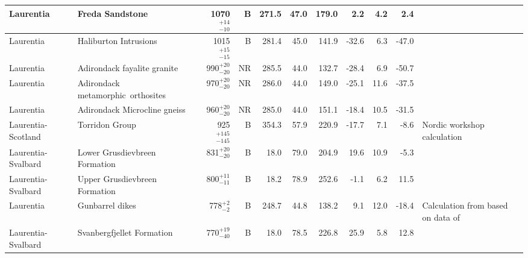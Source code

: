 \documentclass[twocolumn, switch]{article} %
\begin{document}
{\begin{landscape}
\begin{ThreePartTable}
\begin{longtable}{p{1.4 in}p{1.2 in}rrrrrrrrp{1.2 in}}
                     Laurentia &                                    Freda Sandstone &   1070$^{+14}_{-10}$ &      B &     271.5 &      47.0 & 179.0 &   2.2 &       4.2 &         2.4 &                                  \cite{Henry1977a} \\ \hline
                     Laurentia &                              Haliburton Intrusions &   1015$^{+15}_{-15}$ &      B &     281.4 &      45.0 & 141.9 & -32.6 &       6.3 &       -47.0 &                                \cite{Warnock2000a} \\ \hline
                     Laurentia &                        Adirondack fayalite granite &    990$^{+20}_{-20}$ &     NR &     285.5 &      44.0 & 132.7 & -28.4 &       6.9 &       -50.7 &                                  \cite{Brown2012a} \\ \hline
                     Laurentia &               Adirondack metamorphic\ orthosites &    970$^{+20}_{-20}$ &     NR &     286.0 &      44.0 & 149.0 & -25.1 &      11.6 &       -37.5 &                                  \cite{Brown2012a} \\ \hline
                     Laurentia &                       Adirondack Microcline gneiss &    960$^{+20}_{-20}$ &     NR &     285.0 &      44.0 & 151.1 & -18.4 &      10.5 &       -31.5 &                                  \cite{Brown2012a} \\ \hline
            Laurentia-Scotland &                                     Torridon Group &  925$^{+145}_{-145}$ &      B &     354.3 &      57.9 & 220.9 & -17.7 &       7.1 &        -8.6 &                        Nordic workshop calculation \\ \hline
            Laurentia-Svalbard &                      Lower Grusdievbreen Formation &    831$^{+20}_{-20}$ &      B &      18.0 &      79.0 & 204.9 &  19.6 &      10.9 &        -5.3 &                                 \cite{Maloof2006a} \\ \hline
            Laurentia-Svalbard &                      Upper Grusdievbreen Formation &    800$^{+11}_{-11}$ &      B &      18.2 &      78.9 & 252.6 &  -1.1 &       6.2 &        11.5 &                                 \cite{Maloof2006a} \\ \hline
                     Laurentia &                                    Gunbarrel dikes &      778$^{+2}_{-2}$ &      B &     248.7 &      44.8 & 138.2 &   9.1 &      12.0 &       -18.4 &  Calculation from \cite{Eyster2020a} based on data of \cite{Harlan1993a, Harlan1997a} \\ \hline
            Laurentia-Svalbard &                          Svanbergfjellet Formation &    770$^{+19}_{-40}$ &      B &      18.0 &      78.5 & 226.8 &  25.9 &       5.8 &        12.8 &                                 \cite{Maloof2006a} \\ \hline

\end{longtable}
\end{ThreePartTable}
\end{landscape}}
\end{document}
